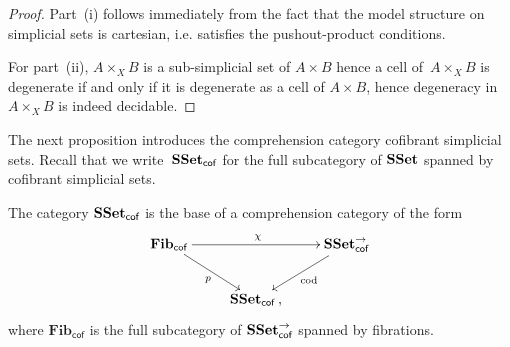 \documentclass[reqno,10pt,a4paper,oneside,draft]{amsart}
\begin{document}
\begin{proof} Part~(i) follows immediately from the fact that the model structure on simplicial sets is cartesian, i.e. satisfies the pushout-product conditions.


For part~(ii), $A \times_X B$ is a sub-simplicial set of $A \times B$ hence a cell of~$A \times_X B$ is degenerate if and only if it is degenerate as a cell of $A \times B$, hence degeneracy
in~$A \times_X B$ is indeed decidable. 
\end{proof}


The next proposition introduces the  comprehension category  cofibrant simplicial sets.
Recall that we write~$\mathbf{SSet}_{\mathsf{cof}}$ for the full subcategory of $\mathbf{SSet}$ spanned by
cofibrant simplicial sets. 


\begin{proposition} \label{thm:compcat}
The category $\mathbf{SSet}_{\mathsf{cof}}$ is the base of a comprehension category
of the form
\begin{equation*}
\begin{gathered}
\xymatrix{
\mathbf{Fib}_{ \mathsf{cof}} \ar[dr]_{p} \ar[rr]^{\chi} & & \SSet^{\to}_{\mathsf{cof}} \ar[dl]^{\mathrm{cod}} \\ 
 & \SSet_{\mathsf{cof}} \, , &  }
 \end{gathered}
 \end{equation*}
 where $\mathbf{Fib}_{ \mathsf{cof}}$ is the full subcategory of $\mathbf{SSet}^{\to}_{\mathsf{cof}}$ spanned by fibrations.
\end{proposition} 
\end{document}
